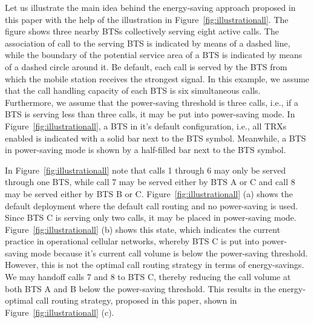 Let us illustrate the main idea behind the energy-saving approach proposed in this paper with the help of the illustration in Figure~\ref{fig:illustrationall}. The figure shows three nearby BTSs collectively serving eight active calls. The association of call to the serving BTS is indicated by means of a dashed line, while the boundary of the potential service area of a BTS is indicated by means of a dashed circle around it. Be default, each call is served by the BTS from which the mobile station receives the strongest signal. In this example, we assume that the call handling capacity of each BTS is six simultaneous calls. Furthermore, we assume that the power-saving threshold is three calls, i.e., if a BTS is serving less than three calls, it may be put into power-saving mode. In Figure~\ref{fig:illustrationall}, a BTS in it's default configuration, i.e., all TRXs enabled is indicated with a solid bar next to the BTS symbol. Meanwhile, a BTS in power-saving mode is shown by a half-filled bar next to the BTS symbol.


In Figure~\ref{fig:illustrationall} note that calls 1 through 6 may only be served through one BTS, while call 7 may be served either by BTS A or C and call 8 may be served either by BTS B or C. Figure~\ref{fig:illustrationall} (a) shows the default deployment where the default call routing and no power-saving is used. Since BTS C is serving only two calls, it may be placed in power-saving mode. Figure~\ref{fig:illustrationall} (b) shows this state, which indicates the current practice in operational cellular networks, whereby BTS C is put into power-saving mode because it's current call volume is below the power-saving threshold. However, this is not the optimal call routing strategy in terms of energy-savings. We may handoff calls 7 and 8 to BTS C, thereby reducing the call volume at both BTS A and B below the power-saving threshold. This results in the energy-optimal call routing strategy, proposed in this paper, shown in Figure~\ref{fig:illustrationall} (c). 


